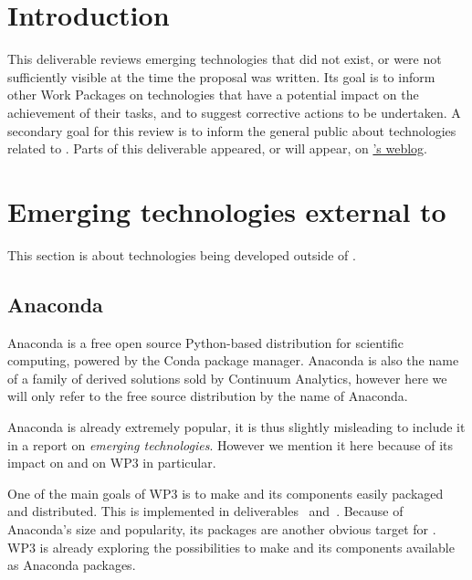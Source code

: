 \documentclass{deliverablereport}
\author{Erik Bray, Luca De Feo, Viviane Pons, Tom Wiesing}
\begin{document}
\maketitle
\githubissuedescription
\tableofcontents
\newpage

\section{Introduction}
This deliverable reviews emerging technologies that did not exist, or
were not sufficiently visible at the time the \ODK proposal was
written. Its goal is to inform other Work Packages on technologies
that have a potential impact on the achievement of their tasks, and to
suggest corrective actions to be undertaken.  A secondary goal for
this review is to inform the general public about technologies related
to \ODK. Parts of this deliverable appeared, or will appear, on
\href{http://opendreamkit.org}{\ODK's weblog}.

\section{Emerging technologies external to \ODK}
\label{sec:external}

This section is about technologies being developed outside of \ODK.

\subsection{Anaconda}
\label{sec:anaconda}

Anaconda is a free open source Python-based distribution for
scientific computing, powered by the Conda package manager. Anaconda
is also the name of a family of derived solutions sold by Continuum
Analytics, however here we will only refer to the free source
distribution by the name of Anaconda.

Anaconda is already extremely popular, it is thus slightly misleading
to include it in a report on \emph{emerging technologies}. However we
mention it here because of its impact on \ODK and on WP3 in
particular.

One of the main goals of WP3 is to make \Sage and its components
easily packaged and distributed. This is implemented in
deliverables~
and~. Because of
Anaconda's size and popularity, its packages are another obvious
target for \ODK. WP3 is already exploring the possibilities to make
\Sage and its components available as Anaconda packages.
\end{document}
